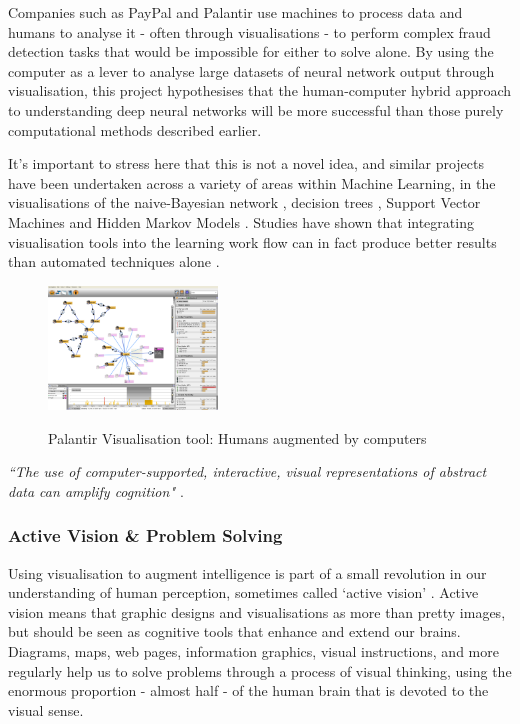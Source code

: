 \documentclass[a4paper,11pt,titlepage]{article}
\begin{document}
Companies such as PayPal and Palantir use machines to process data and humans to analyse it - often through visualisations - to perform complex fraud detection tasks that would be impossible for either to solve alone. By using the computer as a lever to analyse large datasets of neural network output through visualisation, this project hypothesises that the human-computer hybrid approach to understanding deep neural networks will be more successful than those purely computational methods described earlier.
	\par 
	It's important to stress here that this is not a novel idea, and similar projects have been undertaken across a variety of areas within Machine Learning, in the visualisations of the naive-Bayesian network \cite{Becker2001}, decision trees \cite{Ankerst1999}, Support Vector Machines \cite{Caragea2001} and Hidden Markov Models \cite{Dai2008}. Studies have shown that integrating visualisation tools into the learning work flow can in fact produce better results than automated techniques alone \cite{Ware2002}.

		\begin{figure}[H]
    			\centering	
			{{\includegraphics[width=0.4\textwidth]
    				{img/palantir_01.png} 
    			}}%
    			\caption{Palantir Visualisation tool: Humans augmented by computers}%
    		\label{fig:Palantir}
		\end{figure}

\textit{``The use of computer-supported, interactive, visual representations of abstract data can amplify cognition" \cite{card1999}}.


\subsubsection{Active Vision \& Problem Solving}
 	Using visualisation to augment intelligence is part of a small revolution in our understanding of human perception, sometimes called `active vision' \cite{Ware2010}. Active vision means that graphic designs and visualisations as more than pretty images, but should be seen as cognitive tools that enhance and extend our brains. Diagrams, maps, web pages, information graphics, visual instructions, and more regularly help us to solve problems through a process of visual thinking, using the enormous proportion - almost half - of the human brain that is devoted to the visual sense.  
 		
\end{document}
